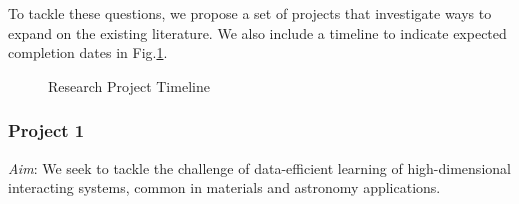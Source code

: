 \documentclass{article}
\begin{document}
To tackle these questions, we propose a set of projects that investigate  ways to expand on the existing literature. We also include a timeline to indicate expected completion dates in Fig.\ref{fig.timeline}.

\begin{figure}[ht]
\centering
{}
\caption{Research Project Timeline}
\label{fig.timeline}
\end{figure}

\subsubsection*{Project 1}

\textit{Aim}: We seek to tackle the challenge of data-efficient learning of high-dimensional interacting systems, common in materials and astronomy applications. 
\end{document}
